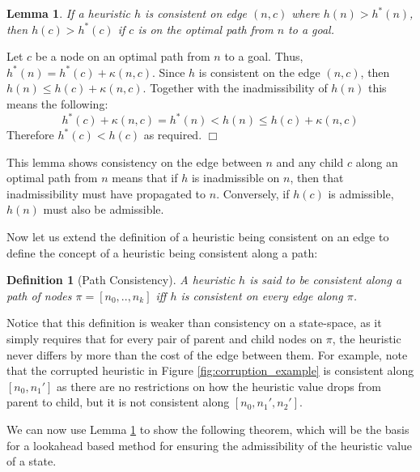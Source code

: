 \documentclass[letterpaper]{article}
\newtheorem{lemma}{Lemma}
\newtheorem{definition}{Definition}
\newenvironment{proof}{\par\noindent{\em Proof.}}{\hfill $\Box$\medskip}
\begin{document}
\begin{lemma}%
\label{lemma:inad_corruption}
If a heuristic $h$ is consistent on edge $(n, c)$ where $h(n)>h^*(n)$, then $h(c) > h^*(c)$ if $c$ is on the optimal path from $n$ to a goal.
\label{lem:inadmissible-corruption}
\end{lemma}
\begin{proof}
Let $c$ be a node on an optimal path from $n$ to a goal.
Thus, $h^*(n)=h^*(c)+\kappa (n,c)$. Since $h$ is consistent on the edge $(n, c)$, then $h(n)\leq h(c)+\kappa(n,c)$. Together with the inadmissibility of $h(n)$ this means the following:
\[ h^*(c)+\kappa(n,c)= h^*(n) < h(n) \leq h(c)+\kappa(n,c) \]
Therefore $h^*(c)<h(c)$ as required.
\end{proof}


This lemma shows consistency on the edge between $n$ and any child $c$ along an optimal path from $n$ means that if $h$ is inadmissible on $n$, then that inadmissibility must have propagated to $n$. Conversely, if $h(c)$ is admissible, $h(n)$ must also be admissible.

Now let us extend the definition of a heuristic being consistent on an edge to define the concept of a heuristic being consistent along a path:

\begin{definition}[Path Consistency]
A heuristic $h$ is said to be consistent along a path of nodes $\pi=[n_0,..,n_k]$ iff $h$ is consistent on every edge along $\pi$.
\end{definition}
Notice that this definition is weaker than consistency on a state-space, as it simply requires that for every pair of parent and child nodes on $\pi$, the heuristic never differs by more than the cost of the edge between them.
For example, note that the corrupted heuristic in Figure \ref{fig:corruption_example} is consistent along $[n_0, n_1']$ as there are no restrictions on how the heuristic value drops from parent to child, but it is not consistent along $[n_0, n_1', n_2']$.

We can now use Lemma \ref{lemma:inad_corruption} to show the following theorem, which will be the basis for a lookahead based method for ensuring the admissibility of the heuristic value of a state.

\end{document}
